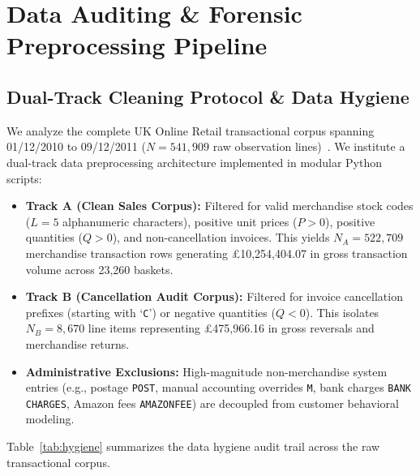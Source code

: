 \documentclass[sigconf,nonacm]{acmart}
\begin{document}
\section{Data Auditing \& Forensic Preprocessing Pipeline}

\subsection{Dual-Track Cleaning Protocol \& Data Hygiene}
We analyze the complete UK Online Retail transactional corpus spanning 01/12/2010 to 09/12/2011 ($N = 541,909$ raw observation lines)~\cite{chen2015online}. We institute a dual-track data preprocessing architecture implemented in modular Python scripts:

\begin{itemize}
    \item \textbf{Track A (Clean Sales Corpus):} Filtered for valid merchandise stock codes ($L=5$ alphanumeric characters), positive unit prices ($P > 0$), positive quantities ($Q > 0$), and non-cancellation invoices. This yields $N_A = 522,709$ merchandise transaction rows generating £10,254,404.07 in gross transaction volume across 23,260 baskets.
    \item \textbf{Track B (Cancellation Audit Corpus):} Filtered for invoice cancellation prefixes (starting with `\texttt{C}') or negative quantities ($Q < 0$). This isolates $N_B = 8,670$ line items representing £475,966.16 in gross reversals and merchandise returns.
    \item \textbf{Administrative Exclusions:} High-magnitude non-merchandise system entries (e.g., postage \texttt{POST}, manual accounting overrides \texttt{M}, bank charges \texttt{BANK CHARGES}, Amazon fees \texttt{AMAZONFEE}) are decoupled from customer behavioral modeling.
\end{itemize}

Table~\ref{tab:hygiene} summarizes the data hygiene audit trail across the raw transactional corpus.
\end{document}
